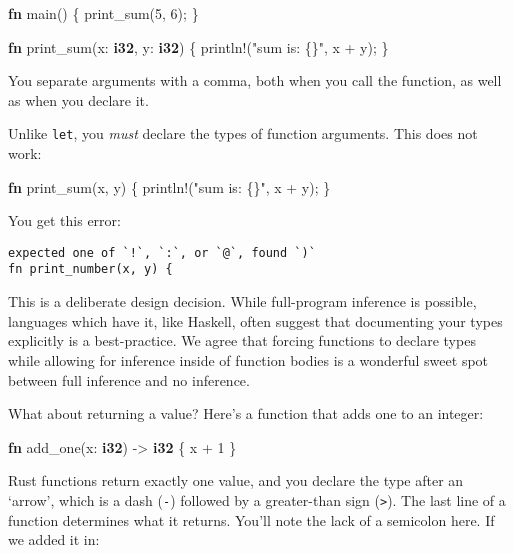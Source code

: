 \documentclass[a4paper,]{book}
\newenvironment{Shaded}{\begin{snugshade}}{\end{snugshade}}
\newcommand{\KeywordTok}[1]{\textcolor[rgb]{0.13,0.29,0.53}{\textbf{{#1}}}}
\newcommand{\DecValTok}[1]{\textcolor[rgb]{0.00,0.00,0.81}{{#1}}}
\newcommand{\StringTok}[1]{\textcolor[rgb]{0.31,0.60,0.02}{{#1}}}
\newcommand{\OtherTok}[1]{\textcolor[rgb]{0.56,0.35,0.01}{{#1}}}
\newcommand{\NormalTok}[1]{{#1}}
\begin{document}
\begin{Shaded}
\begin{Highlighting}[]
\KeywordTok{fn} \NormalTok{main() \{}
    \NormalTok{print_sum(}\DecValTok{5}\NormalTok{, }\DecValTok{6}\NormalTok{);}
\NormalTok{\}}

\KeywordTok{fn} \NormalTok{print_sum(x: }\KeywordTok{i32}\NormalTok{, y: }\KeywordTok{i32}\NormalTok{) \{}
    \OtherTok{println!}\NormalTok{(}\StringTok{"sum is: \{\}"}\NormalTok{, x + y);}
\NormalTok{\}}
\end{Highlighting}
\end{Shaded}

You separate arguments with a comma, both when you call the function, as
well as when you declare it.

Unlike \texttt{let}, you \emph{must} declare the types of function
arguments. This does not work:

\begin{Shaded}
\begin{Highlighting}[]
\KeywordTok{fn} \NormalTok{print_sum(x, y) \{}
    \OtherTok{println!}\NormalTok{(}\StringTok{"sum is: \{\}"}\NormalTok{, x + y);}
\NormalTok{\}}
\end{Highlighting}
\end{Shaded}

You get this error:

\begin{verbatim}
expected one of `!`, `:`, or `@`, found `)`
fn print_number(x, y) {
\end{verbatim}

This is a deliberate design decision. While full-program inference is
possible, languages which have it, like Haskell, often suggest that
documenting your types explicitly is a best-practice. We agree that
forcing functions to declare types while allowing for inference inside
of function bodies is a wonderful sweet spot between full inference and
no inference.

What about returning a value? Here's a function that adds one to an
integer:

\begin{Shaded}
\begin{Highlighting}[]
\KeywordTok{fn} \NormalTok{add_one(x: }\KeywordTok{i32}\NormalTok{) -> }\KeywordTok{i32} \NormalTok{\{}
    \NormalTok{x + }\DecValTok{1}
\NormalTok{\}}
\end{Highlighting}
\end{Shaded}

Rust functions return exactly one value, and you declare the type after
an `arrow', which is a dash (\texttt{-}) followed by a greater-than sign
(\texttt{\textgreater{}}). The last line of a function determines what
it returns. You'll note the lack of a semicolon here. If we added it in:
\end{document}
